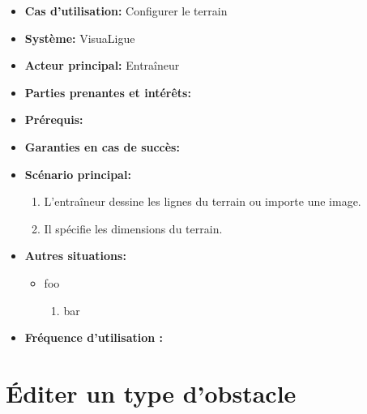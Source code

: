 \begin{itemize}
    \item \textbf{Cas d'utilisation:} Configurer le terrain
    \item \textbf{Syst\`eme:} VisuaLigue
    \item \textbf{Acteur principal:} Entra\^ineur
    \item \textbf{Parties prenantes et int\'er\^ets:}
    \item \textbf{Pr\'erequis:}
    \item \textbf{Garanties en cas de succ\`es:}
    \item \textbf{Sc\'enario principal:}
        \begin{enumerate}
            \item L'entraîneur dessine les lignes du terrain ou importe une image.
            \item Il spécifie les dimensions du terrain.
    \end{enumerate}
    \item \textbf{Autres situations:}
        \begin{itemize}
            \item foo
                \begin{enumerate}
                    \item bar
               \end{enumerate}
 
        \end{itemize}
  	\item \textbf{Fréquence d'utilisation :}
\end{itemize}



\section{Éditer un type d'obstacle}
\label{sec:editer_un_type_d_obstacle}

